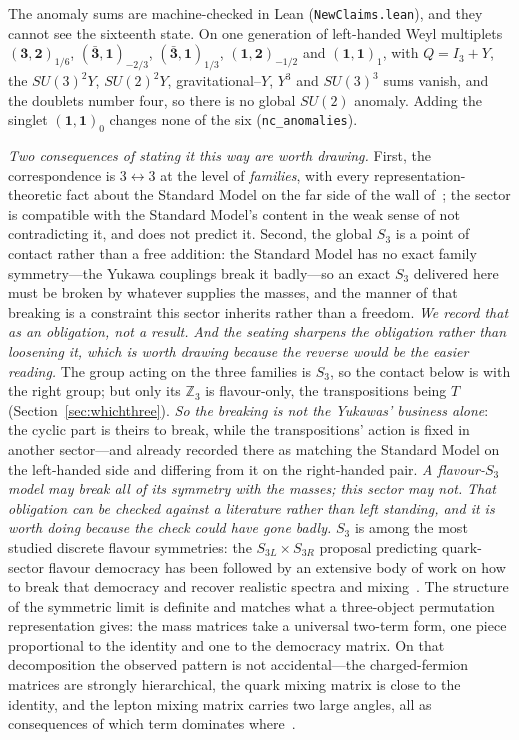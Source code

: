 \documentclass[11pt]{article}
\begin{document}
The anomaly sums are machine-checked in Lean (\texttt{NewClaims.lean}), and they cannot see the sixteenth state. On one generation of left-handed Weyl multiplets $(\mathbf3,\mathbf2)_{1/6}$, $(\bar{\mathbf3},\mathbf1)_{-2/3}$, $(\bar{\mathbf3},\mathbf1)_{1/3}$, $(\mathbf1,\mathbf2)_{-1/2}$ and $(\mathbf1,\mathbf1)_{1}$, with $Q=I_{3}+Y$, the $SU(3)^{2}Y$, $SU(2)^{2}Y$, gravitational--$Y$, $Y^{3}$ and $SU(3)^{3}$ sums vanish, and the doublets number four, so there is no global $SU(2)$ anomaly. Adding the singlet $(\mathbf1,\mathbf1)_{0}$ changes none of the six (\texttt{nc\_anomalies}).

\emph{Two consequences of stating it this way are worth drawing.} First, the correspondence is
$3\leftrightarrow3$ at the level of \emph{families}, with every representation-theoretic fact about the
Standard Model on the far side of the wall of~\cite{JanzenBoundary}; the sector is compatible with the Standard
Model's content in the weak sense of not contradicting it, and does not predict it. Second, the global $S_3$ is
a point of contact rather than a free addition: the Standard Model has no exact family symmetry---the Yukawa
couplings break it badly---so an exact $S_3$ delivered here must be broken by whatever supplies the masses, and
the manner of that breaking is a constraint this sector inherits rather than a freedom. \emph{We record that as
an obligation, not a result.} \emph{And the seating sharpens the obligation rather than loosening it, which is
worth drawing because the reverse would be the easier reading.} The group acting on the three families is
$S_3$, so the contact below is with the right group; but only its $\mathbb{Z}_3$ is flavour-only, the
transpositions being $T$ (Section~\ref{sec:whichthree}). \emph{So the breaking is not the Yukawas' business
alone}: the cyclic part is theirs to break, while the transpositions' action is fixed in another sector---and
already recorded there as matching the Standard Model on the left-handed side and differing from it on the
right-handed pair. \emph{A flavour-$S_3$ model may break all of its symmetry with the masses; this sector may
not.} \emph{That obligation can be checked against a literature rather than left standing, and it is worth doing
because the check could have gone badly.} $S_3$ is among the most studied discrete flavour symmetries: the
$S_{3L}\times S_{3R}$ proposal predicting quark-sector flavour democracy has been followed by an extensive
body of work on how to break that democracy and recover realistic spectra and
mixing~\cite{HarariHautWeyers1978,XingYangZhou2010}. The structure of the symmetric limit is definite and
matches what a three-object permutation representation gives: the mass matrices take a universal two-term form,
one piece proportional to the identity and one to the democracy matrix. On that decomposition the observed
pattern is not accidental---the charged-fermion matrices are strongly hierarchical, the quark mixing matrix is
close to the identity, and the lepton mixing matrix carries two large angles, all as consequences of which term
dominates where~\cite{XingYangZhou2010}.
\end{document}
